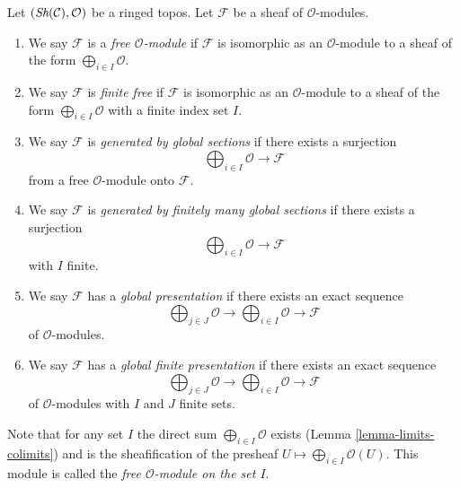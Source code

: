 \begin{definition}
\label{definition-global}
Let $(\mathop{\textit{Sh}}\nolimits(\mathcal{C}), \mathcal{O})$ be a ringed topos.
Let $\mathcal{F}$ be a sheaf of $\mathcal{O}$-modules.
\begin{enumerate}
\item We say $\mathcal{F}$ is a {\it free $\mathcal{O}$-module}
if $\mathcal{F}$ is isomorphic as an $\mathcal{O}$-module
to a sheaf of the form $\bigoplus_{i \in I} \mathcal{O}$.
\item We say $\mathcal{F}$ is {\it finite free} if
$\mathcal{F}$ is isomorphic as an $\mathcal{O}$-module
to a sheaf of the form $\bigoplus_{i \in I} \mathcal{O}$
with a finite index set $I$.
\item We say $\mathcal{F}$ is {\it generated by global sections}
if there exists a surjection
$$
\bigoplus\nolimits_{i \in I} \mathcal{O} \longrightarrow \mathcal{F}
$$
from a free $\mathcal{O}$-module onto $\mathcal{F}$.
\item We say $\mathcal{F}$ is {\it generated by finitely many global sections}
if there exists a surjection
$$
\bigoplus\nolimits_{i \in I} \mathcal{O} \longrightarrow \mathcal{F}
$$
with $I$ finite.
\item We say $\mathcal{F}$ has a {\it global presentation}
if there exists an exact sequence
$$
\bigoplus\nolimits_{j \in J} \mathcal{O} \longrightarrow
\bigoplus\nolimits_{i \in I} \mathcal{O} \longrightarrow
\mathcal{F}
$$
of $\mathcal{O}$-modules.
\item We say $\mathcal{F}$ has a {\it global finite presentation}
if there exists an exact sequence
$$
\bigoplus\nolimits_{j \in J} \mathcal{O} \longrightarrow
\bigoplus\nolimits_{i \in I} \mathcal{O} \longrightarrow
\mathcal{F}
$$
of $\mathcal{O}$-modules with $I$ and $J$ finite sets.
\end{enumerate}
\end{definition}

\noindent
Note that for any set $I$ the direct sum
$\bigoplus_{i \in I} \mathcal{O}$ exists
(Lemma \ref{lemma-limits-colimits})
and is the sheafification of the presheaf
$U \mapsto \bigoplus_{i \in I} \mathcal{O}(U)$.
This module is called the {\it free $\mathcal{O}$-module on the set $I$}.

